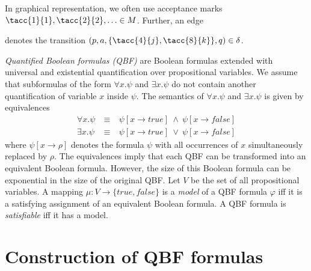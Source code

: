 \documentclass[runningheads]{llncs}
\def\false{\mathit{false}}
\def\true{\mathit{true}}
\begin{document}
In graphical representation, we often use acceptance marks
$\tacc{1}{1},\tacc{2}{2},\ldots\in M$. Further, an edge 
denotes the transition $(p,a,\{\tacc{4}{j},\tacc{8}{k}\},q)\in\delta$. 

\bigskip

\emph{Quantified Boolean formulas (QBF)} are Boolean formulas
extended with universal and existential quantification over
propositional variables. We assume that subformulas of the form
$\forall x.\psi$ and $\exists x.\psi$ do not contain another
quantification of variable $x$ inside $\psi$. The semantics of
$\forall x.\psi$ and $\exists x.\psi$ is given by equivalences
\[
  \begin{array}{rcl}
    \forall x.\psi &~\equiv~& \psi[x\rightarrow\true]~\wedge~\psi[x\rightarrow\false]\\
    \exists x.\psi &~\equiv~& \psi[x\rightarrow\true]~\vee~   \psi[x\rightarrow\false]
  \end{array}
\]
where $\psi[x\rightarrow \rho]$ denotes the formula $\psi$ with all
occurrences of $x$ simultaneously replaced by $\rho$. The equivalences
imply that each QBF can be transformed into an equivalent Boolean
formula. However, the size of this Boolean formula can be exponential
in the size of the original QBF. Let $V$ be the set of all
propositional variables. A mapping $\mu:V\rightarrow\{\true,\false\}$
is a \emph{model} of a QBF formula $\varphi$ iff it is a satisfying
assignment of an equivalent Boolean formula. A QBF formula is
\emph{satisfiable} iff it has a model.



\section{Construction of QBF formulas}\label{sec:qbf}
\end{document}
